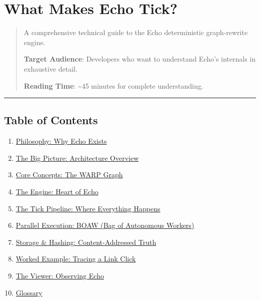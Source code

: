 \documentclass[
]{book}
\author{}
\date{}
\providecommand{\tightlist}{%
  \setlength{\itemsep}{0pt}\setlength{\parskip}{0pt}}
\begin{document}
\frontmatter

\mainmatter
\chapter{What Makes Echo Tick?}\label{what-makes-echo-tick}

\begin{quote}
A comprehensive technical guide to the Echo deterministic graph-rewrite
engine.

\textbf{Target Audience}: Developers who want to understand Echo's
internals in exhaustive detail.

\textbf{Reading Time}: \textasciitilde45 minutes for complete
understanding.
\end{quote}

\begin{center}\rule{0.5\linewidth}{0.5pt}\end{center}

\section{Table of Contents}\label{table-of-contents}

\begin{enumerate}
\def\labelenumi{\arabic{enumi}.}
\tightlist
\item
  \hyperref[1-philosophy-why-echo-exists]{Philosophy: Why Echo Exists}
\item
  \hyperref[2-the-big-picture-architecture-overview]{The Big Picture:
  Architecture Overview}
\item
  \hyperref[3-core-concepts-the-warp-graph]{Core Concepts: The WARP
  Graph}
\item
  \hyperref[4-the-engine-heart-of-echo]{The Engine: Heart of Echo}
\item
  \hyperref[5-the-tick-pipeline-where-everything-happens]{The Tick
  Pipeline: Where Everything Happens}
\item
  \hyperref[6-parallel-execution-boaw-bag-of-autonomous-workers]{Parallel
  Execution: BOAW (Bag of Autonomous Workers)}
\item
  \hyperref[7-storage--hashing-content-addressed-truth]{Storage \&
  Hashing: Content-Addressed Truth}
\item
  \hyperref[8-worked-example-tracing-a-link-click]{Worked Example:
  Tracing a Link Click}
\item
  \hyperref[9-the-viewer-observing-echo]{The Viewer: Observing Echo}
\item
  \hyperref[10-glossary]{Glossary}
\end{enumerate}
\end{document}

